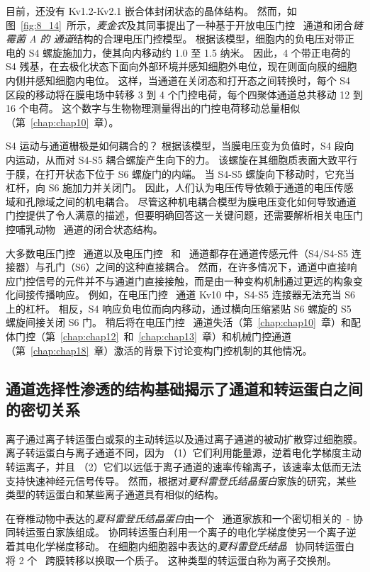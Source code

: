目前，还没有 Kv1.2-Kv2.1 嵌合体封闭状态的晶体结构。
然而，如图~\ref{fig:8_14}~所示，\textit{麦金农}及其同事提出了一种基于开放电压门控~ 通道和闭合\textit{链霉菌 A 的  通道}结构的合理电压门控模型。
根据该模型，细胞内的负电压对带正电的 S4 螺旋施加力，使其向内移动约 1.0 至 1.5 纳米。
因此，4 个带正电荷的 S4 残基，在去极化状态下面向外部环境并感知细胞外电位，现在则面向膜的细胞内侧并感知细胞内电位。
这样，当通道在关闭态和打开态之间转换时，每个 S4 区段的移动将在膜电场中转移 3 到 4 个门控电荷，每个四聚体通道总共移动 12 到 16 个电荷。 
这个数字与生物物理测量得出的门控电荷移动总量相似（第~\ref{chap:chap10}~章）。


S4 运动与通道栅极是如何耦合的？
根据该模型，当膜电压变为负值时，S4 段向内运动，从而对 S4-S5 耦合螺旋产生向下的力。
该螺旋在其细胞质表面大致平行于膜，在打开状态下位于 S6 螺旋门的内端。
当 S4-S5 螺旋向下移动时，它充当杠杆，向 S6 施加力并关闭门。
因此，人们认为电压传导依赖于通道的电压传感域和孔隙域之间的机电耦合。
尽管这种机电耦合模型为膜电压变化如何导致通道门控提供了令人满意的描述，但要明确回答这一关键问题，还需要解析相关电压门控哺乳动物~ 通道的闭合状态结构。


大多数电压门控~ 通道以及电压门控~ 和~ 通道都存在通道传感元件（S4/S4-S5 连接器）与孔门（S6）之间的这种直接耦合。
然而，在许多情况下，通道中直接响应门控信号的元件并不与通道门直接接触，而是由一种变构机制通过更远的构象变化间接传播响应。
例如，在电压门控~ 通道 Kv10 中，S4-S5 连接器无法充当 S6 上的杠杆。
相反，S4 响应负电位而向内移动，通过横向压缩紧贴 S6 螺旋的 S5 螺旋间接关闭 S6 门。
稍后将在电压门控~ 通道失活（第~\ref{chap:chap10}~章）和配体门控（第~\ref{chap:chap12}~和~\ref{chap:chap13}~章）和机械门控通道（第~\ref{chap:chap18}~章）激活的背景下讨论变构门控机制的其他情况。



\subsection{通道选择性渗透的结构基础揭示了通道和转运蛋白之间的密切关系}

离子通过离子转运蛋白或泵的主动转运以及通过离子通道的被动扩散穿过细胞膜。
离子转运蛋白与离子通道不同，因为
（1）它们利用能量源，逆着电化学梯度主动转运离子，并且
（2）它们以远低于离子通道的速率传输离子，该速率太低而无法支持快速神经元信号传导。
然而，根据对\textit{夏科雷登氏结晶蛋白}家族的研究，某些类型的转运蛋白和某些离子通道具有相似的结构。


在脊椎动物中表达的\textit{夏科雷登氏结晶蛋白}由一个~ 通道家族和一个密切相关的~- 协同转运蛋白家族组成。
协同转运蛋白利用一个离子的电化学梯度使另一个离子逆着其电化学梯度移动。
在细胞内细胞器中表达的\textit{夏科雷登氏结晶}~ 协同转运蛋白将 2 个~ 跨膜转移以换取一个质子。
这种类型的转运蛋白称为离子交换剂。



